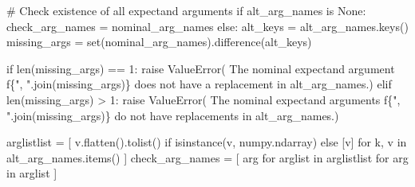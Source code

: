 \documentclass[
  letterpaper,
  DIV=11,
  numbers=noendperiod]{scrartcl}
\newenvironment{Shaded}{\begin{snugshade}}{\end{snugshade}}
\newcommand{\BuiltInTok}[1]{\textcolor[rgb]{0.00,0.23,0.31}{#1}}
\newcommand{\CommentTok}[1]{\textcolor[rgb]{0.37,0.37,0.37}{#1}}
\newcommand{\ControlFlowTok}[1]{\textcolor[rgb]{0.00,0.23,0.31}{#1}}
\newcommand{\DecValTok}[1]{\textcolor[rgb]{0.68,0.00,0.00}{#1}}
\newcommand{\KeywordTok}[1]{\textcolor[rgb]{0.00,0.23,0.31}{#1}}
\newcommand{\NormalTok}[1]{\textcolor[rgb]{0.00,0.23,0.31}{#1}}
\newcommand{\OperatorTok}[1]{\textcolor[rgb]{0.37,0.37,0.37}{#1}}
\newcommand{\PreprocessorTok}[1]{\textcolor[rgb]{0.68,0.00,0.00}{#1}}
\newcommand{\SpecialCharTok}[1]{\textcolor[rgb]{0.37,0.37,0.37}{#1}}
\newcommand{\SpecialStringTok}[1]{\textcolor[rgb]{0.13,0.47,0.30}{#1}}
\newcommand{\StringTok}[1]{\textcolor[rgb]{0.13,0.47,0.30}{#1}}
\newcommand{\VariableTok}[1]{\textcolor[rgb]{0.07,0.07,0.07}{#1}}
\begin{document}
\begin{Shaded}
\begin{Highlighting}[]
  \CommentTok{\# Check existence of all expectand arguments}
  \ControlFlowTok{if}\NormalTok{ alt\_arg\_names }\KeywordTok{is} \VariableTok{None}\NormalTok{:}
\NormalTok{    check\_arg\_names }\OperatorTok{=}\NormalTok{ nominal\_arg\_names}
  \ControlFlowTok{else}\NormalTok{:}
\NormalTok{    alt\_keys }\OperatorTok{=}\NormalTok{ alt\_arg\_names.keys()}
\NormalTok{    missing\_args }\OperatorTok{=} \BuiltInTok{set}\NormalTok{(nominal\_arg\_names).difference(alt\_keys)}

    \ControlFlowTok{if} \BuiltInTok{len}\NormalTok{(missing\_args) }\OperatorTok{==} \DecValTok{1}\NormalTok{:}
      \ControlFlowTok{raise} \PreprocessorTok{ValueError}\NormalTok{( }\StringTok{\textquotesingle{}The nominal expectand argument \textquotesingle{}}
                       \SpecialStringTok{f\textquotesingle{}}\SpecialCharTok{\{}\StringTok{", "}\SpecialCharTok{.}\NormalTok{join(missing\_args)}\SpecialCharTok{\}}\SpecialStringTok{ does not have \textquotesingle{}}
                        \StringTok{\textquotesingle{}a replacement in \textasciigrave{}alt\_arg\_names\textasciigrave{}.\textquotesingle{}}\NormalTok{)}
    \ControlFlowTok{elif} \BuiltInTok{len}\NormalTok{(missing\_args) }\OperatorTok{\textgreater{}} \DecValTok{1}\NormalTok{:}
      \ControlFlowTok{raise} \PreprocessorTok{ValueError}\NormalTok{( }\StringTok{\textquotesingle{}The nominal expectand arguments \textquotesingle{}}
                       \SpecialStringTok{f\textquotesingle{}}\SpecialCharTok{\{}\StringTok{", "}\SpecialCharTok{.}\NormalTok{join(missing\_args)}\SpecialCharTok{\}}\SpecialStringTok{ do not have \textquotesingle{}}
                        \StringTok{\textquotesingle{}replacements in \textasciigrave{}alt\_arg\_names\textasciigrave{}.\textquotesingle{}}\NormalTok{)}

\NormalTok{    arglistlist }\OperatorTok{=}\NormalTok{ [ v.flatten().tolist()}
                    \ControlFlowTok{if} \BuiltInTok{isinstance}\NormalTok{(v, numpy.ndarray)}
                    \ControlFlowTok{else}\NormalTok{ [v]}
                    \ControlFlowTok{for}\NormalTok{ k, v }\KeywordTok{in}\NormalTok{ alt\_arg\_names.items() ]}
\NormalTok{    check\_arg\_names }\OperatorTok{=}\NormalTok{ [ arg }\ControlFlowTok{for}\NormalTok{ arglist }\KeywordTok{in}\NormalTok{ arglistlist}
                        \ControlFlowTok{for}\NormalTok{ arg }\KeywordTok{in}\NormalTok{ arglist ]}


\end{Highlighting}
\end{Shaded}
\end{document}
